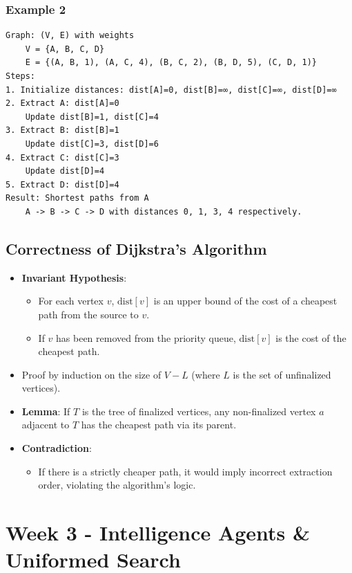 \documentclass[8pt]{article}
\begin{document}
\subsubsection*{Example 2}

\begin{verbatim}
Graph: (V, E) with weights
    V = {A, B, C, D}
    E = {(A, B, 1), (A, C, 4), (B, C, 2), (B, D, 5), (C, D, 1)}
Steps:
1. Initialize distances: dist[A]=0, dist[B]=∞, dist[C]=∞, dist[D]=∞
2. Extract A: dist[A]=0
    Update dist[B]=1, dist[C]=4
3. Extract B: dist[B]=1
    Update dist[C]=3, dist[D]=6
4. Extract C: dist[C]=3
    Update dist[D]=4
5. Extract D: dist[D]=4
Result: Shortest paths from A
    A -> B -> C -> D with distances 0, 1, 3, 4 respectively.
\end{verbatim}

\subsection*{Correctness of Dijkstra's Algorithm}
\begin{itemize}
    \item \textbf{Invariant Hypothesis}:
    \begin{itemize}
        \item For each vertex \( v \), \( \text{dist}[v] \) is an upper bound of the cost of a cheapest path from the source to \( v \).
        \item If \( v \) has been removed from the priority queue, \( \text{dist}[v] \) is the cost of the cheapest path.
    \end{itemize}
    \item Proof by induction on the size of \( V - L \) (where \( L \) is the set of unfinalized vertices).
    \item \textbf{Lemma}: If \( T \) is the tree of finalized vertices, any non-finalized vertex \( a \) adjacent to \( T \) has the cheapest path via its parent.
    \item \textbf{Contradiction}:
    \begin{itemize}
        \item If there is a strictly cheaper path, it would imply incorrect extraction order, violating the algorithm's logic.
    \end{itemize}
\end{itemize}

\section{Week 3 - Intelligence Agents \& Uniformed Search}
\end{document}
